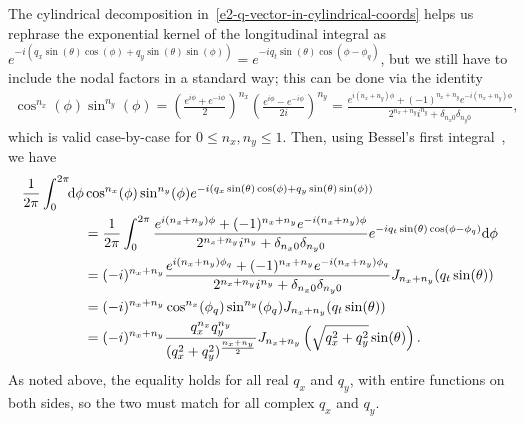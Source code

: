 The cylindrical decomposition in~\eqref{e2-q-vector-in-cylindrical-coords} helps us rephrase the exponential kernel of the longitudinal integral as $e^{-i (q_x\sin(\theta)\cos(\phi) + q_y\sin(\theta)\sin(\phi) )}=e^{-iq_t\sin(\theta)\cos(\phi-\phi_q)}$, but we still have to include the nodal factors in a standard way; this can be done via the identity
\begin{align}
\cos^{n_x}(\phi)\sin^{n_y}(\phi)
=
\left(\frac{e^{i\phi}+e^{-i\phi}}{2}\right)^{n_x}
\left(\frac{e^{i\phi}-e^{-i\phi}}{2i}\right)^{n_y}
\!\!=
\frac{
 e^{i(n_x+n_y)\phi} + (-1)^{n_x+n_y} e^{-i(n_x+n_y)\phi}
 }{
 2^{n_x+n_y}i^{n_y} + \delta_{n_x0}\delta_{n_y0}
 }
,
\end{align}
which is valid case-by-case for $0\leq n_x, n_y \leq 1$. Then, using Bessel's first integral~, we have
{\allowdisplaybreaks
\begin{align}
\frac{1}{2\pi}
\int_0^{2\pi}\!\!\mathrm{d}\phi
&
\cos^{n_x}(\phi)\sin^{n_y}(\phi)
e^{-i (q_x\sin(\theta)\cos(\phi) + q_y\sin(\theta)\sin(\phi) )}
\nonumber \\ & =
\frac{1}{2\pi}
\int_0^{2\pi}
\frac{
 e^{i(n_x+n_y)\phi} + (-1)^{n_x+n_y} e^{-i(n_x+n_y)\phi}
 }{
 2^{n_x+n_y}i^{n_y} + \delta_{n_x0}\delta_{n_y0}
 }
e^{-iq_t\sin(\theta)\cos(\phi-\phi_q)}
\mathrm{d}\phi
\nonumber \\ & =
(-i)^{n_x+n_y}
\frac{
 e^{i(n_x+n_y)\phi_q} + (-1)^{n_x+n_y} e^{-i(n_x+n_y)\phi_q}
 }{
 2^{n_x+n_y}i^{n_y} + \delta_{n_x0}\delta_{n_y0}
 }
J_{n_x+n_y}(q_t\sin(\theta))
\nonumber \\ & =
(-i)^{n_x+n_y}
\cos^{n_x}(\phi_q)\sin^{n_y}(\phi_q)
J_{n_x+n_y}(q_t\sin(\theta))
\nonumber \\ & =
(-i)^{n_x+n_y}
\frac{ q_x^{n_x} q_y^{n_{\smash[b]{y}}}  }{(q_x^2+q_y^2)^\frac{n_x+n_y}{2}}
J_{n_x+n_y}\left(\sqrt{q_x^2+q_y^2}\sin(\theta)\right)
.
\label{e2-shape-factor-longitudinal-integral-to-bessel}
\end{align}
}%
As noted above, the equality holds for all real $q_x$ and $q_y$, with entire functions on both sides, so the two must match for all complex $q_x$ and $q_y$.

